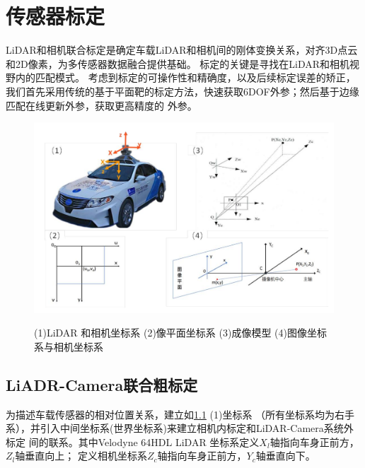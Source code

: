 %
%
%

\chapter{传感器标定}
\label{intro} %
\label{sec:1}

LiDAR和相机联合标定是确定车载LiDAR和相机间的刚体变换关系，对齐3D点云和2D像素，为多传感器数据融合提供基础。
标定的关键是寻找在LiDAR和相机视野内的匹配模式。
考虑到标定的可操作性和精确度，以及后续标定误差的矫正，
我们首先采用传统的基于平面靶的标定方法，快速获取6DOF外参；然后基于边缘匹配在线更新外参，获取更高精度的
外参。


\begin{figure}
\begin{center}
    \includegraphics[width=14cm]{fig/coord.pdf} \\
    \caption{(1)LiDAR 和相机坐标系 (2)像平面坐标系 (3)成像模型 (4)图像坐标系与相机坐标系}
    \label{fig: coordinate}
\end{center}
\end{figure}

\section{LiADR-Camera联合粗标定}

为描述车载传感器的相对位置关系，建立如\figurename\ref{fig: coordinate} (1)坐标系
（所有坐标系均为右手系），并引入中间坐标系(世界坐标系)来建立相机内标定和LiDAR-Camera系统外标定
间的联系。其中Velodyne 64HDL LiDAR 坐标系定义$X_{l}$轴指向车身正前方，$Z_{l}$轴垂直向上；
定义相机坐标系$Z_{c}$轴指向车身正前方，$Y_{c}$轴垂直向下。


